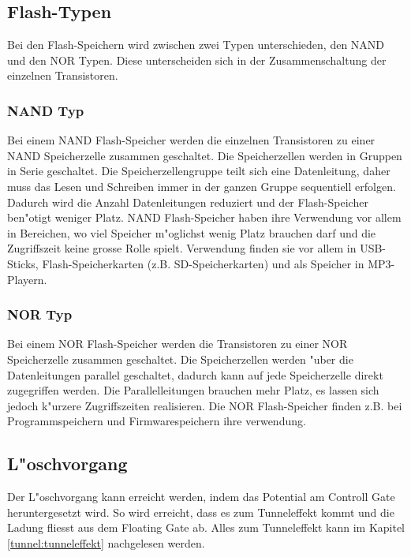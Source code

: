 \begin{refsection}
\subsection{Flash-Typen}
Bei den Flash-Speichern wird zwischen zwei Typen unterschieden, den NAND
und den NOR Typen.
Diese unterscheiden sich in der Zusammenschaltung der einzelnen Transistoren.

\subsubsection{NAND Typ}
Bei einem NAND Flash-Speicher werden die einzelnen Transistoren zu einer
NAND Speicherzelle zusammen geschaltet.
Die Speicherzellen werden in Gruppen in Serie geschaltet.
Die Speicherzellengruppe teilt sich eine Datenleitung, daher muss das
Lesen und Schreiben immer in der ganzen Gruppe sequentiell erfolgen.
Dadurch wird die Anzahl Datenleitungen reduziert und der Flash-Speicher
ben"otigt weniger Platz.
NAND Flash-Speicher haben ihre Verwendung vor allem in Bereichen, wo viel
Speicher m"oglichst wenig Platz brauchen darf und die Zugriffszeit keine
grosse Rolle spielt.
Verwendung finden sie vor allem in USB-Sticks, Flash-Speicherkarten
(z.B. SD-Speicherkarten) und als Speicher in MP3-Playern.

\subsubsection{NOR Typ}
Bei einem NOR Flash-Speicher werden die Transistoren zu einer NOR
Speicherzelle zusammen geschaltet.
Die Speicherzellen werden "uber die Datenleitungen parallel geschaltet,
dadurch kann auf jede Speicherzelle direkt zugegriffen werden.
Die Parallelleitungen brauchen mehr Platz, es lassen sich jedoch k"urzere
Zugriffszeiten realisieren.
Die NOR Flash-Speicher finden z.B. bei Programmspeichern und Firmwarespeichern
ihre verwendung.

\subsection{L"oschvorgang}
Der L"oschvorgang kann erreicht werden, indem das Potential am 
Controll Gate heruntergesetzt wird.
So wird erreicht, dass es zum Tunneleffekt kommt und die Ladung fliesst
aus dem Floating Gate ab.
Alles zum Tunneleffekt kann im Kapitel \ref{tunnel:tunneleffekt} nachgelesen werden.


\end{refsection}
